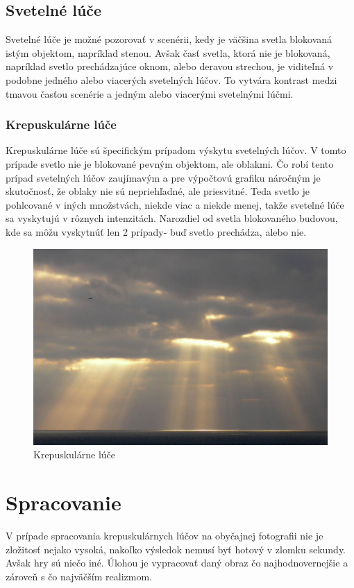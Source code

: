 \documentclass[10pt,twoside,slovak,a4paper]{article}
\begin{document}
\subsection{Svetelné lúče} \label{se:luce}
Svetelné lúče je možné pozorovať v scenérii, kedy je väčšina svetla blokovaná istým 
objektom, napríklad stenou. Avšak časť svetla, ktorá nie je blokovaná, napríklad svetlo 
prechádzajúce oknom, alebo deravou strechou, je viditeľná v podobne jedného alebo viacerých 
svetelných lúčov. To vytvára kontrast medzi tmavou časťou scenérie a jedným alebo viacerými 
svetelnými lúčmi.

\subsubsection{Krepuskulárne lúče} \label{se:luce:kl}
Krepuskulárne lúče sú špecifickým prípadom výskytu svetelných lúčov. V tomto prípade 
svetlo nie je blokované pevným objektom, ale oblakmi. Čo robí tento prípad svetelných 
lúčov zaujímavým a pre výpočtovú grafiku náročným je skutočnosť, že oblaky nie sú 
nepriehľadné, ale priesvitné. Teda svetlo je pohlcované v iných množstvách, niekde 
viac a niekde menej, takže svetelné lúče sa vyskytujú v rôznych intenzitách. Narozdiel 
od svetla blokovaného budovou, kde sa môžu vyskytnúť len 2 prípady- buď svetlo prechádza, 
alebo nie.

\begin{figure}[h]
    \centering
    \includegraphics[scale=0.2]{god_ray.jpg}
    \caption{Krepuskulárne lúče}
    \label{fig:kl}
\end{figure}

\section{Spracovanie} \label{spracovanie}
V prípade spracovania krepuskulárnych lúčov na obyčajnej fotografii nie je zložitosť 
nejako vysoká, nakoľko výsledok nemusí byť hotový v zlomku sekundy. Avšak hry sú niečo 
iné. Úlohou je vypracovať daný obraz čo najhodnovernejšie a zároveň s čo najväčším 
realizmom.
\end{document}

